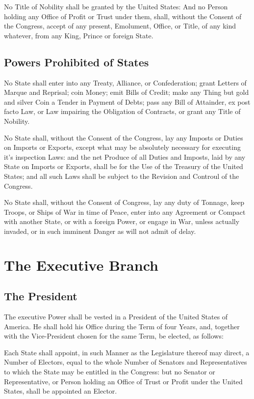 \documentclass{constitution}
\begin{document}
No Title of Nobility shall be granted by the United States:
And no Person holding any Office of Profit or Trust under them, shall,
without the Consent of the Congress,
accept of any present, Emolument, Office, or Title, of any kind whatever,
from any King, Prince or foreign State.

\section{Powers Prohibited of States}
No State shall enter into any Treaty, Alliance, or Confederation;
grant Letters of Marque and Reprisal;
coin Money;
emit Bills of Credit;
make any Thing but gold and silver Coin a Tender in Payment of Debts;
pass any Bill of Attainder,
ex post facto Law,
or Law impairing the Obligation of Contracts,
or grant any Title of Nobility.

No State shall, without the Consent of the Congress,
lay any Imposts or Duties on Imports or Exports,
except what may be absolutely necessary for executing it's inspection Laws:
and the net Produce of all Duties and Imposts,
laid by any State on Imports or Exports,
shall be for the Use of the Treasury of the United States;
and all such Laws shall be subject to the Revision and Controul of the Congress.

No State shall, without the Consent of Congress,
lay any duty of Tonnage,
keep Troops, or Ships of War in time of Peace,
enter into any Agreement or Compact with another State, or with a foreign Power,
or engage in War, unless actually invaded,
or in such imminent Danger as will not admit of delay.

\chapter{The Executive Branch}
\section{The President}
The executive Power shall be vested in a President of the United States of America.
He shall hold his Office during the Term of four Years,
and, together with the Vice-President chosen for the same Term,
be elected, as follows:

Each State shall appoint,
in such Manner as the Legislature thereof may direct,
a Number of Electors, equal to the whole Number of Senators and Representatives
to which the State may be entitled in the Congress:
but no Senator or Representative,
or Person holding an Office of Trust or Profit under the United States,
shall be appointed an Elector.
\end{document}
